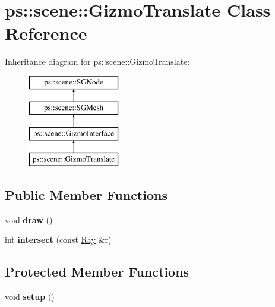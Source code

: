 \hypertarget{classps_1_1scene_1_1GizmoTranslate}{}\section{ps\+:\+:scene\+:\+:Gizmo\+Translate Class Reference}
\label{classps_1_1scene_1_1GizmoTranslate}
Inheritance diagram for ps\+:\+:scene\+:\+:Gizmo\+Translate\+:\begin{figure}[H]
\begin{center}
\leavevmode
\includegraphics[height=4.000000cm]{classps_1_1scene_1_1GizmoTranslate}
\end{center}
\end{figure}
\subsection*{Public Member Functions}
\begin{DoxyCompactItemize}
\item 
\hypertarget{classps_1_1scene_1_1GizmoTranslate_aca58c171403c76574eee0ea04accf8c5}{}void {\bfseries draw} ()\label{classps_1_1scene_1_1GizmoTranslate_aca58c171403c76574eee0ea04accf8c5}

\item 
\hypertarget{classps_1_1scene_1_1GizmoTranslate_a3c4afe3233bd1733bc8243c048c90ec0}{}int {\bfseries intersect} (const \hyperlink{classps_1_1base_1_1Ray}{Ray} \&r)\label{classps_1_1scene_1_1GizmoTranslate_a3c4afe3233bd1733bc8243c048c90ec0}

\end{DoxyCompactItemize}
\subsection*{Protected Member Functions}
\begin{DoxyCompactItemize}
\item 
\hypertarget{classps_1_1scene_1_1GizmoTranslate_a7604e066324193919e707c0bfbf6de20}{}void {\bfseries setup} ()\label{classps_1_1scene_1_1GizmoTranslate_a7604e066324193919e707c0bfbf6de20}

\end{DoxyCompactItemize}
